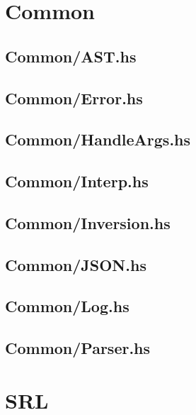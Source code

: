 \section{Common}
\label{app:interpreter_common}
\subsection{Common/AST.hs}
\label{app:Common_AST_hs}

\subsection{Common/Error.hs}
\label{app:Common_Error_hs}

\subsection{Common/HandleArgs.hs}
\label{app:Common_HandleArgs_hs}

\subsection{Common/Interp.hs}
\label{app:Common_Interp_hs}

\subsection{Common/Inversion.hs}
\label{app:Common_Inversion_hs}

\subsection{Common/JSON.hs}
\label{app:Common_JSON_hs}

\subsection{Common/Log.hs}
\label{app:Common_Log_hs}

\subsection{Common/Parser.hs}
\label{app:Common_Parser_hs}

\section{SRL}
\label{app:interpreter_srl}

